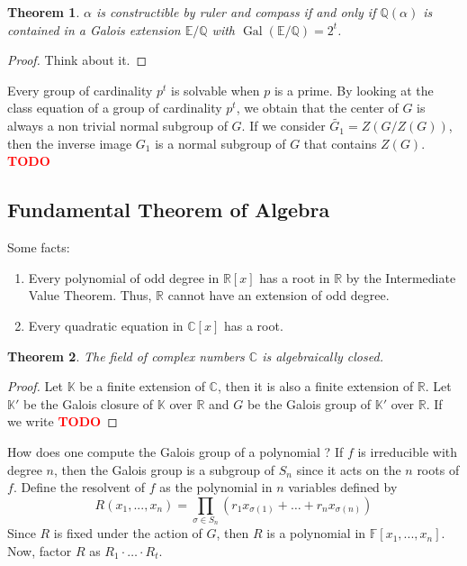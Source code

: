 \documentclass{article}
\theoremstyle{plain}
\newtheorem{theorem}{Theorem}[subsection]
\theoremstyle{definition}
\newcommand{\C}{\mathbb{C}}
\newcommand{\R}{\mathbb{R}}
\newcommand{\Q}{\mathbb{Q}}
\newcommand{\F}{\mathbb{F}}
\newcommand{\E}{\mathbb{E}}
\newcommand{\K}{\mathbb{K}}
\DeclareMathOperator{\Gal}{Gal}
\newcommand{\td}{\textcolor{red}{\textbf{TODO}}}
\begin{document}
\begin{theorem}
    $\alpha$ is constructible by ruler and compass if and only if $\Q(\alpha)$ is contained in a Galois extension $\E / \Q$ with $\Gal(\E / \Q) = 2^t$.
\end{theorem}

\begin{proof}
    Think about it.
\end{proof}

Every group of cardinality $p^t$ is solvable when $p$ is a prime. By looking at the class equation of a group of cardinality $p^t$, we obtain that the center of $G$ is always a non trivial normal subgroup of $G$. If we consider $\tilde{G_1} = Z(G / Z(G))$, then the inverse image $G_1$ is a normal subgroup of $G$ that contains $Z(G)$. \td 

\subsection{Fundamental Theorem of Algebra}

Some facts:
\begin{enumerate}
    \item Every polynomial of odd degree in $\R[x]$ has a root in $\R$ by the Intermediate Value Theorem. Thus, $\R$ cannot have an extension of odd degree.
    \item Every quadratic equation in $\C[x]$ has a root.
\end{enumerate}

\begin{theorem}
    The field of complex numbers $\C$ is algebraically closed.
\end{theorem}

\begin{proof}
    Let $\K$ be a finite extension of $\C$, then it is also a finite extension of $\R$. Let $\K'$ be the Galois closure of $\K$ over $\R$ and $G$ be the Galois group of $\K'$ over $\R$. If we write \td  
\end{proof}

How does one compute the Galois group of a polynomial ? If $f$ is irreducible with degree $n$, then the Galois group is a subgroup of $S_n$ since it acts on the $n$ roots of $f$. Define the resolvent of $f$ as the polynomial in $n$ variables defined by
$$R(x_1, ..., x_n) = \prod_{\sigma \in S_n}(r_1 x_{\sigma(1)} + \dots + r_n x_{\sigma(n)})$$
Since $R$ is fixed under the action of $G$, then $R$ is a polynomial in $\F[x_1, ..., x_n]$. Now, factor $R$ as $R_1 \cdot \dots \cdot R_t$.
\end{document}
